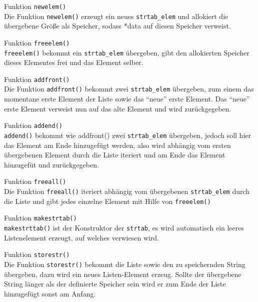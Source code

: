 Funktion \texttt{newelem()} \\
Die Funktion \texttt{newelem()} erzeugt ein neues \texttt{strtab\_elem} und allokiert die übergebene Größe als Speicher, sodass *data auf diesen Speicher verweist.

Funktion \texttt{freeelem()} \\
\texttt{freeelem()} bekommt ein \texttt{strtab\_elem} übergeben, gibt den allokierten Speicher dieses Elementes frei und das Element selber.

Funktion \texttt{addfront()} \\
Die Funktion \texttt{addfront()} bekommt zwei \texttt{strtab\_elem} übergeben, zum einem das momentane erste Element der Liste sowie das ``neue'' erste Element. Das ``neue'' erste Element verweist nun auf das alte Element und wird zurückgegeben.

Funktion \texttt{addend()} \\
\texttt{addend()} bekommt wie addfront() zwei \texttt{strtab\_elem} übergeben, jedoch soll hier das Element am Ende hinzugefügt werden, also wird abhängig vom ersten übergebenen Element durch die Liste iteriert und am Ende das Element hinzugefüt und zurückgegeben.

Funktion \texttt{freeall()} \\
Die Funktion \texttt{freeall()} iteriert abhängig vom übergebenen \texttt{strtab\_elem} durch die Liste und gibt jedes einzelne Element mit Hilfe von \texttt{freeelem()}

Funktion \texttt{makestrtab()} \\
\texttt{makestrttab()} ist der Konstruktor der \texttt{strtab}, es wird automatisch ein leeres Listenelement erzeugt, auf welches verwiesen wird.

Funktion \texttt{storestr()} \\
Die Funktion \texttt{storestr()} bekommt die Liste sowie den zu speichernden String übergeben, dazu wird ein neues Listen-Element erzeug. Sollte der übergebene String länger als der definierte Speicher sein wird er zum Ende der Liste hinzugefügt sonst am Anfang.